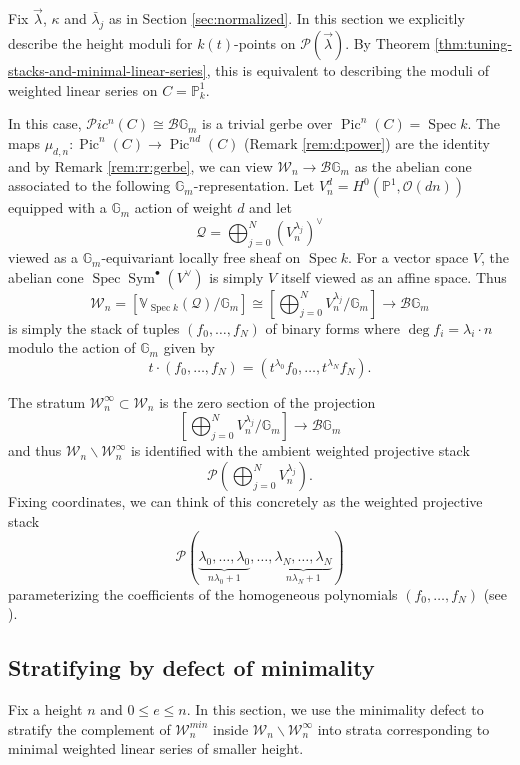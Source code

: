 \documentclass[a4paper,12pt]{amsart}
\theoremstyle{definition}
\newcommand{\bG}{\mathbb{G}}
\newcommand{\bP}{\mathbb{P}}
\newcommand{\bV}{\mathbb{V}}
\newcommand{\cO}{\mathcal{O}}
\newcommand{\cQ}{\mathcal{Q}}
\newcommand{\cW}{\mathcal{W}}
\newcommand{\Pcv}{\mathcal{P}(\vec{\lambda})}
\newcommand{\Pc}{\mathcal{P}}
\newcommand{\lambdavec}{{\vec{\lambda}}}
\DeclareMathOperator{\Spec}{Spec}
\DeclareMathOperator{\Pic}{Pic}
\DeclareMathOperator{\Sym}{Sym}
\newcommand{\Ppic}{\mathcal{P}ic}
\renewcommand{\setminus}{\smallsetminus}
\begin{document}
	
	Fix $\lambdavec$, $\kappa$ and $\bar{\lambda}_j$ as in Section \ref{sec:normalized}. In this section we explicitly describe the height moduli for $k(t)$-points on $\Pcv$. By Theorem \ref{thm:tuning-stacks-and-minimal-linear-series}, this is equivalent to describing the moduli of weighted linear series on $C=\bP^1_{k}$. 
	
	In this case, $\Ppic^n(C) \cong \mathcal{B} \bG_m$ is a trivial gerbe over $\Pic^n(C) = \Spec k$. The maps $\mu_{d,n} : \Pic^n(C) \to \Pic^{nd}(C)$ (Remark \ref{rem:d:power}) are the identity and by Remark \ref{rem:rr:gerbe}, we can view $\cW_n \to \mathcal{B} \bG_m$ as the abelian cone associated to the following $\bG_m$-representation. Let $V^d_n = H^0(\bP^1, \cO(dn))$ equipped with a $\bG_m$ action of weight $d$ and let 
	$$
	\cQ = \bigoplus_{j = 0}^N (V^{\lambda_j}_n)^{\vee}
	$$
	viewed as a $\bG_m$-equivariant locally free sheaf on $\Spec k$. For a vector space $V$, the abelian cone $\Spec \Sym^\bullet (V^{\vee})$ is simply $V$ itself viewed as an affine space. Thus
	$$
	\cW_n = [\bV_{\Spec k}(\cQ)/\bG_m] \cong  \left[\bigoplus_{j = 0}^N V^{\lambda_j}_n/\bG_m\right] \to \mathcal{B} \bG_m
	$$
	is simply the stack of tuples $(f_0, \ldots, f_N)$ of binary forms where $\deg f_i = \lambda_i \cdot n$ modulo the action of $\bG_m$ given by
	$$
	t \cdot (f_0, \ldots, f_N) = (t^{\lambda_0}f_0, \ldots, t^{\lambda_N}f_N). 
	$$
	
	The stratum $\cW_n^\infty \subset \cW_n$ is the zero section of the projection 
	$$
	\left[\bigoplus_{j = 0}^N V^{\lambda_j}_n/\bG_m\right] \to \mathcal{B}\bG_m
	$$
	and thus $\cW_n \setminus \cW_n^\infty$ is identified with the ambient weighted projective stack
	$$
	\Pc\left(\bigoplus_{j = 0}^N V^{\lambda_j}_n\right).
	$$
	Fixing coordinates, we can think of this concretely as the weighted projective stack
	$$
	\Pc(\underbrace{\lambda_0, \ldots, \lambda_0}_{n\lambda_0 + 1}, \ldots, \underbrace{\lambda_N, \ldots, \lambda_N}_{n\lambda_N + 1})
	$$
	parameterizing the coefficients of the homogeneous polynomials $(f_0, \ldots, f_N)$ (see \cite[Sec. 4.1]{JJ}). 
	
	\subsection{Stratifying by defect of minimality}\label{sec:str_min}
	
	Fix a height $n$ and $0 \le e \le n$. In this section, we use the minimality defect to stratify the complement of $\cW_n^{min}$ inside $\cW_n \setminus \cW_n^{\infty}$ into strata corresponding to minimal weighted linear series of smaller height. 
	
\end{document}
